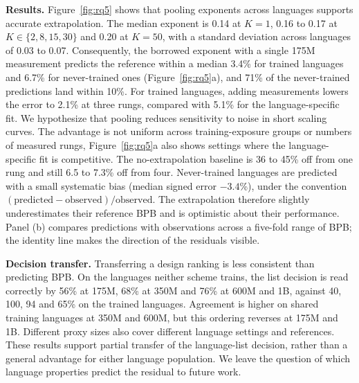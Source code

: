 \textbf{Results.} Figure~\ref{fig:rq5} shows that pooling exponents across languages supports accurate extrapolation. The median exponent is 0.14 at $K = 1$, 0.16 to 0.17 at $K \in \{2, 8, 15, 30\}$ and 0.20 at $K = 50$, with a standard deviation across languages of 0.03 to 0.07. Consequently, the borrowed exponent with a single 175M measurement predicts the reference within a median 3.4\% for trained languages and 6.7\% for never-trained ones (Figure~\ref{fig:rq5}a), and 71\% of the never-trained predictions land within 10\%. For trained languages, adding measurements lowers the error to 2.1\% at three rungs, compared with 5.1\% for the language-specific fit. We hypothesize that pooling reduces sensitivity to noise in short scaling curves. The advantage is not uniform across training-exposure groups or numbers of measured rungs, Figure~\ref{fig:rq5}a also shows settings where the language-specific fit is competitive. The no-extrapolation baseline is 36 to 45\% off from one rung and still 6.5 to 7.3\% off from four. Never-trained languages are predicted with a small systematic bias (median signed error $-3.4$\%), under the convention $(\mathrm{predicted}-\mathrm{observed})/\mathrm{observed}$. The extrapolation therefore slightly underestimates their reference BPB and is optimistic about their performance. Panel (b) compares predictions with observations across a five-fold range of BPB; the identity line makes the direction of the residuals visible.

\textbf{Decision transfer.} Transferring a design ranking is less consistent than predicting BPB. On the languages neither scheme trains, the list decision is read correctly by 56\% at 175M, 68\% at 350M and 76\% at 600M and 1B, against 40, 100, 94 and 65\% on the trained languages. Agreement is higher on shared training languages at 350M and 600M, but this ordering reverses at 175M and 1B. Different proxy sizes also cover different language settings and references. These results support partial transfer of the language-list decision, rather than a general advantage for either language population. We leave the question of which language properties predict the residual to future work.
